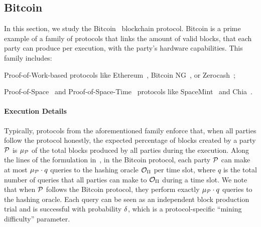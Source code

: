 \subsection{Bitcoin}\label{subsec:bitcoin}

In this section, we study the Bitcoin~\cite{nakamoto2008bitcoin} blockchain
protocol. Bitcoin is a prime example of a family of protocols that links the
amount of valid blocks, that each party can produce per execution, with the
party's hardware capabilities. This family includes:
\begin{inparaenum}[i)]
    \item Proof-of-Work-based protocols like Ethereum~\cite{wood2014ethereum},
        Bitcoin NG~\cite{eyal2016bitcoin}, or Zerocash~\cite{SP:BCGGMT14};
    \item Proof-of-Space~\cite{C:DFKP15} and
        Proof-of-Space-Time~\cite{C:MorOrl19} protocols like
        SpaceMint~\cite{FC:PKFGAP18} and Chia~\cite{AC:AACKPR17,EC:CohPie18}.
\end{inparaenum}

\paragraph{Execution Details}
Typically, protocols from the aforementioned family enforce that, when all parties follow the protocol honestly, the expected percentage of blocks
created by a party $\mathcal{P}$ is $\mu_{\mathcal{P}}$ of the total blocks
produced by all parties during the execution. Along the lines of the formulation in~\cite{EC:GarKiaLeo15,C:GarKiaLeo17}, in the Bitcoin
protocol, each party $\mathcal{P}$ can make at most $\mu_{\mathcal{P}}
\cdot q$ queries to the hashing oracle $\mathcal{O}_\Pi$ per time slot, where $q$ is the total number of queries that all parties can make to $\mathcal{O}_\Pi$ during a time slot. We note that when $\mathcal{P}$ follows the Bitcoin protocol, they perform exactly $\mu_{\mathcal{P}} \cdot q$ queries to the hashing oracle.
Each query can be seen as an independent block production trial and is
successful with probability $\delta$, which is a
protocol-specific ``mining difficulty'' parameter.

